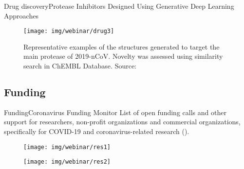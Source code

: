 \documentclass[10pt]{beamer}
\newcommand{\1}{
        	\setbeamertemplate{background}{
        		\texttt{[image: img/1]}
        		\tikz[overlay] \fill[fill opacity=0.75,fill=white] (0,0) rectangle (-\paperwidth,\paperheight);
        	}
}
\begin{document}
\begin{frame}{Drug discovery}{Protease Inhibitors Designed Using Generative Deep Learning Approaches}
	\begin{figure}[]
		\centering
		\texttt{[image: img/webinar/drug3]}
		\label{img:mot2}
		\caption{Representative examples of the structures generated to target the main protease of
			2019-nCoV. Novelty was assessed using similarity search in ChEMBL Database. Source: \cite{Zhavoronkov2020}}
	\end{figure}
\end{frame}



\subsection{Funding}


\begin{frame}{Funding}{Coronavirus Funding Monitor}
	List of open funding calls and other support for researchers, non-profit organizations and commercial organizations, specifically for COVID-19 and coronavirus-related research (\href{https://coronavirus.frontiersin.org/covid-19-research-funding-monitor?utm_source=ad&utm_medium=lk&utm_campaign=ba_cov-cco_corp}{}).
	\begin{figure}[]
		\centering
		\texttt{[image: img/webinar/res1]}				
	\end{figure}

	\begin{figure}[]
		\centering
		\texttt{[image: img/webinar/res2]}				
	\end{figure}
\end{frame}
\end{document}
